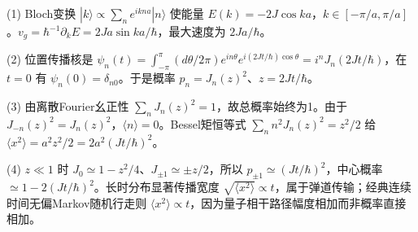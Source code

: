 (1) Bloch变换 \(|k\rangle\propto\sum_ne^{ikna}|n\rangle\) 使能量 \(E(k)=-2J\cos ka\)，\(k\in[-\pi/a,\pi/a]\)。\(v_g=\hbar^{-1}\partial_kE=2Ja\sin ka/\hbar\)，最大速度为 \(2Ja/\hbar\)。

(2) 位置传播核是 \(\psi_n(t)=\int_{-\pi}^{\pi}(d\theta/2\pi)e^{in\theta}e^{i(2Jt/\hbar)\cos\theta}=i^nJ_n(2Jt/\hbar)\)，在 \(t=0\) 有 \(\psi_n(0)=\delta_{n0}\)。于是概率 \(p_n=J_n(z)^2\)、\(z=2Jt/\hbar\)。

(3) 由离散Fourier幺正性 \(\sum_nJ_n(z)^2=1\)，故总概率始终为1。由于 \(J_{-n}(z)^2=J_n(z)^2\)，\(\langle n\rangle=0\)。Bessel矩恒等式 \(\sum_nn^2J_n(z)^2=z^2/2\) 给 \(\boxed{\langle x^2\rangle=a^2z^2/2=2a^2(Jt/\hbar)^2}\)。

(4) \(z\ll1\) 时 \(J_0\simeq1-z^2/4\)、\(J_{\pm1}\simeq\pm z/2\)，所以 \(p_{\pm1}\simeq (Jt/\hbar)^2\)，中心概率 \(\simeq1-2(Jt/\hbar)^2\)。长时分布显著传播宽度 \(\sqrt{\langle x^2\rangle}\propto t\)，属于弹道传输；经典连续时间无偏Markov随机行走则 \(\langle x^2\rangle\propto t\)，因为量子相干路径幅度相加而非概率直接相加。
